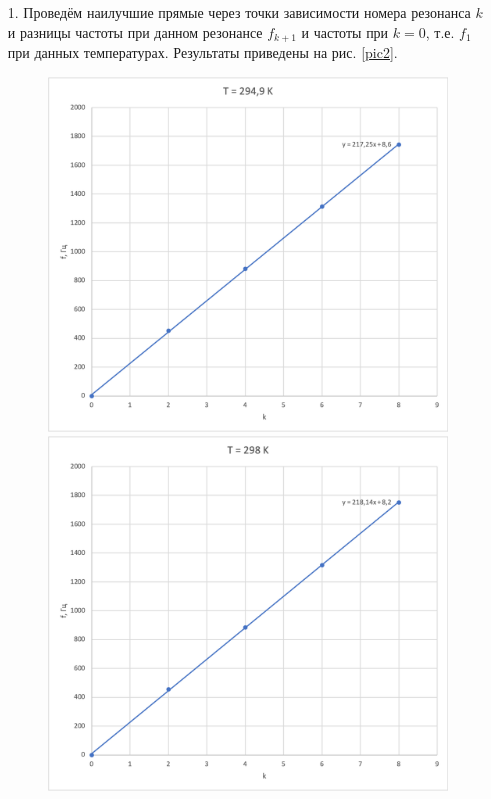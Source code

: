 \documentclass[a4paper, 12pt]{article}
\begin{document}
    \begin{enumerate}
    
        \item[1.] Проведём наилучшие прямые через точки зависимости номера резонанса $k$ и разницы частоты при данном резонансе $f_{k+1}$ и частоты при $k=0$, т.е. $f_1$ при данных температурах. Результаты приведены на рис. \ref{pic2}.
        
        \begin{figure}[ph]
            \begin{minipage}[h]{0.5\linewidth}
                \includegraphics[width=1\linewidth]{1.png}
            \end{minipage}
            \hfill
            \begin{minipage}[h]{0.5\linewidth}
                \includegraphics[width=1\linewidth]{2.png}

\end{minipage}
\end{figure}
\end{enumerate}
\end{document}
